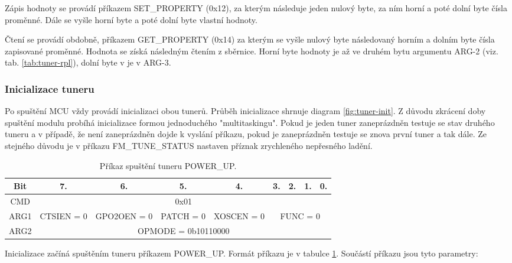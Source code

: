 Zápis hodnoty se provádí příkazem SET\_PROPERTY (0x12), za kterým následuje jeden nulový byte, za ním horní a poté dolní byte čísla proměnné. Dále se vyšle horní byte a poté dolní byte vlastní hodnoty. 

Čtení se provádí obdobně, příkazem GET\_PROPERTY (0x14) za kterým se vyšle nulový byte následovaný horním a dolním byte čísla zapisované proměnné. Hodnota se získá následným čtením z \iic sběrnice. Horní byte hodnoty je až ve druhém bytu argumentu ARG-2 (viz. tab. \ref{tab:tuner-rpl}), dolní byte v je v ARG-3.


\subsubsection{Inicializace tuneru}

Po spuštění MCU vždy provádí inicializaci obou tunerů. Průběh inicializace shrnuje diagram \ref{fig:tuner-init}. Z důvodu zkrácení doby spuštění modulu probíhá inicializace formou jednoduchého "multitaskingu". Pokud je jeden tuner zaneprázdněn testuje se stav druhého tuneru a v případě, že není zaneprázdněn dojde k vyslání příkazu, pokud je zaneprázdněn testuje se znova první  tuner a tak dále. Ze stejného důvodu je v příkazu FM\_TUNE\_STATUS nastaven příznak zrychleného nepřesného ladění.


\begin{table}[ht!]
\begin{center}
\begin{tabular}{|c|c|c|c|c|c|c|c|c|}
\hline 
Bit & 7. & 6. & 5. & 4. & 3. & 2. & 1. & 0. \\ 
\hline 
CMD & \multicolumn{8}{c|}{0x01} \\ 
\hline 
ARG1 & CTSIEN = 0 & GPO2OEN = 0 & PATCH = 0 & XOSCEN = 0 & \multicolumn{4}{c|}{FUNC = 0} \\ 
\hline 
ARG2 & \multicolumn{8}{c|}{OPMODE = 0b10110000} \\ 
\hline 
\end{tabular} 
\end{center}
\caption{Příkaz spuštění tuneru POWER\_UP.}
\label{tab:tuner-power-up} 
\end{table}

Inicializace začíná spuštěním tuneru příkazem POWER\_UP. Formát příkazu je v tabulce \ref{tab:tuner-power-up}. Součástí příkazu jsou tyto parametry:

